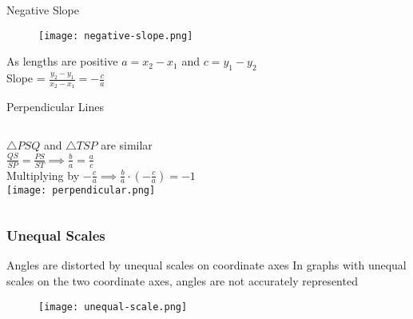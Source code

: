   \begin{frame}{Negative Slope}
    \begin{figure}
      \centering
      \texttt{[image: negative-slope.png]}
    \end{figure}
    As lengths are positive \(a = x_{2} - x_{1}\) and \(c = y_{1} - y_{2} \)  \\
    \bigskip
    Slope  = \(\frac{y_{2} - y_{1}}{x_{2} - x_{1}} = -\frac{c}{a} \) 
  \end{frame}

  \begin{frame}{Perpendicular Lines}
    \begin{columns}
      \(\triangle PSQ \) and \( \triangle TSP \) are similar \\ 

      \bigskip
      \(\frac{QS}{SP} = \frac{PS}{ST} \implies \frac{b}{a} = \frac{a}{c} \) \\

      \bigskip
      Multiplying by \(-\frac{c}{a} \implies \frac{b}{a} \cdot \left( - \frac{c}{a} \right) = -1  \) \\

      \centering
      \texttt{[image: perpendicular.png]} \\ %
  \end{columns}
  
  \end{frame} 

  \begin{frame}
    \frametitle{Unequal Scales}
    \begin{alertblock}{Angles are distorted by unequal scales on coordinate axes}
      In graphs with unequal scales on the two coordinate axes, angles are not
      accurately represented
    \end{alertblock}
    \begin{figure}
      \centering
      \texttt{[image: unequal-scale.png]}
    \end{figure}
  \end{frame}
